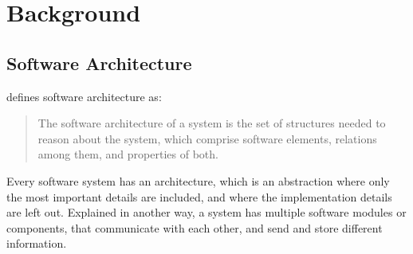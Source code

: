 \chapter[Background]{Background}
\label{ch:background}

\section{Software Architecture}
\citet{softarch} defines software architecture as:

\blockquote{
    The software architecture of a system is the set of structures needed to reason about
    the system, which comprise software elements, relations among them, and properties
    of both.
}

Every software system has an architecture, which is an abstraction where only the most
important details are included, and where the implementation details are left out.
Explained in another way, a system has multiple software modules or components, that communicate
with each other, and send and store different information. 
